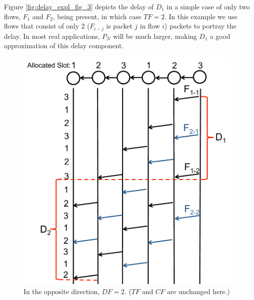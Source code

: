 Figure \ref{fig:delay_expl_fig_3} depicts the delay of $D_1$ in a simple case of only two flows, $F_1$ and $F_2$, being present, in which case $TF = 2$.  In this example we use flows that consist of only $2$ ($F_{i-j}$ is packet $j$ in flow $i$) packets to portray the delay.  In most real applications, $P_N$ will be much larger, making $D_1$ a good approximation of this delay component.

\begin{figure}
\begin{centering}
    \includegraphics[scale=0.35]{figures/delay_limit_expl/fig_2_2.pdf}
    \caption{In the opposite direction, $DF = 2$. ($TF$ and $CF$ are unchanged here.)}
    \label{fig:delay_expl_fig_4}
    \vspace{-6mm}
\end{centering}
\end{figure}



